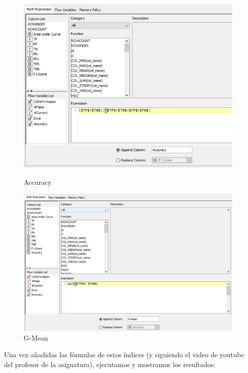 	\begin{figure}[H]
		\begin{minipage}[b]{0.45\linewidth}
			\centering
			\includegraphics[width=0.9\linewidth]{img/math1.png}
			\caption{Accuracy}
		\end{minipage}
		\hspace{0.5cm}
		\begin{minipage}[b]{0.45\linewidth}
			\centering
			\includegraphics[width=1.1\linewidth]{img/math2.png}
			\caption{G-Mean}
		\end{minipage}
	\end{figure}
	
	
	
	Una vez añadidas las fórmulas de estos índices (y siguiendo el video de youtube del profesor de la asignatura), ejecutamos y mostramos los resultados:
	
